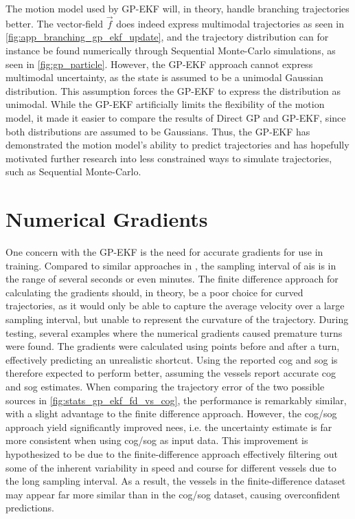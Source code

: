 The motion model used by GP-EKF will, in theory, handle branching trajectories better. The vector-field $\vec{f}$ does indeed express multimodal trajectories as seen in \cref{fig:app_branching_gp_ekf_update}, and the trajectory distribution can for instance be found numerically through Sequential Monte-Carlo simulations, as seen in \cref{fig:gp_particle}. However, the GP-EKF approach cannot express multimodal uncertainty, as the state is assumed to be a unimodal Gaussian distribution. This assumption forces the GP-EKF to express the distribution as unimodal. While the GP-EKF artificially limits the flexibility of the motion model, it made it easier to compare the results of Direct GP and GP-EKF, since both distributions are assumed to be Gaussians.  Thus, the GP-EKF has demonstrated the motion model's ability to predict trajectories and has hopefully motivated further research into less constrained ways to simulate trajectories, such as Sequential Monte-Carlo.

\section{Numerical Gradients}
One concern with the GP-EKF is the need for accurate gradients for use in training. Compared to similar approaches in \cite{vehicle_gp_prediction,pedestrian}, the sampling interval of \acrshort{ais} is in the range of several seconds or even minutes. The finite difference approach for calculating the gradients should, in theory, be a poor choice for curved trajectories, as it would only be able to capture the average velocity over a large sampling interval, but unable to represent the curvature of the trajectory. During testing, several examples where the numerical gradients caused premature turns were found. The gradients were calculated using points before and after a turn, effectively predicting an unrealistic shortcut.  Using the reported \acrshort{cog} and \acrshort{sog} is therefore expected to perform better, assuming the vessels report accurate \acrshort{cog} and \acrshort{sog} estimates. When comparing the trajectory error of the two possible sources in \cref{fig:stats_gp_ekf_fd_vs_cog}, the performance is remarkably similar, with a slight advantage to the finite difference approach. However, the \acrshort{cog}/\acrshort{sog} approach yield significantly improved \acrshort{nees}, i.e. the uncertainty estimate is far more consistent when using \acrshort{cog}/\acrshort{sog} as input data. This improvement is hypothesized to be due to the finite-difference approach effectively filtering out some of the inherent variability in speed and course for different vessels due to the long sampling interval. As a result, the vessels in the finite-difference dataset may appear far more similar than in the \acrshort{cog}/\acrshort{sog} dataset, causing overconfident predictions. 

